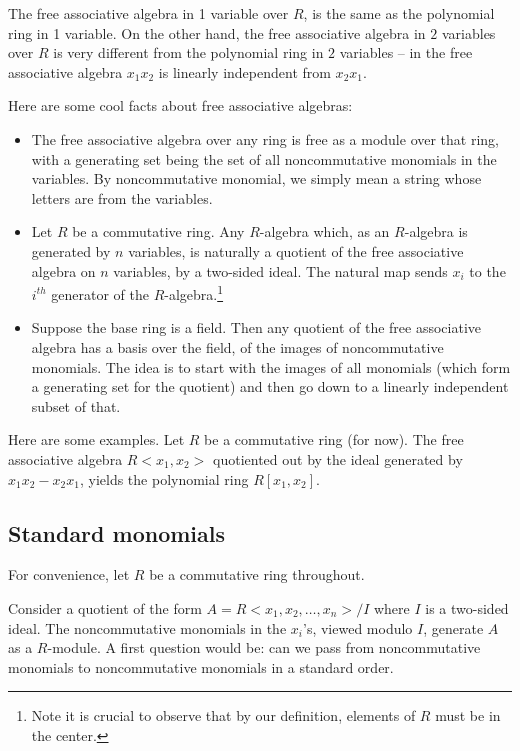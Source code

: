 \documentclass[a4paper]{amsart}
\begin{document}
The free associative algebra in 1 variable over $R$, is the same as
the polynomial ring in 1 variable. On the other hand, the free
associative algebra in $2$ variables over $R$ is very different from
the polynomial ring in $2$ variables -- in the free associative
algebra $x_1x_2$ is linearly independent from $x_2x_1$.

Here are some cool facts about free associative algebras:

\begin{itemize}

\item The free associative algebra over any ring is free as a module
  over that ring, with a generating set being the set of all
  noncommutative monomials in the variables. By noncommutative monomial,
  we simply mean a string whose letters are from the variables.

\item Let $R$ be a commutative ring. Any $R$-algebra which, as an
  $R$-algebra is generated by $n$ variables, is naturally a quotient
  of the free associative algebra on $n$ variables, by a two-sided
  ideal. The natural map sends $x_i$ to the $i^{th}$ generator of the
  $R$-algebra.\footnote{Note it is crucial to observe that by our
    definition, elements of $R$ must be in the center.}
\item Suppose the base ring is a field. Then any quotient of the free
  associative algebra has a basis over the field, of the images of
  noncommutative monomials. The idea is to start with the images of
  all monomials (which form a generating set for the quotient) and
  then go down to a linearly independent subset of that.
\end{itemize}

Here are some examples. Let $R$ be a commutative ring (for now). The
free associative algebra $R<x_1,x_2>$ quotiented out by the ideal
generated by $x_1x_2 - x_2x_1$, yields the polynomial ring $R[x_1,x_2]$.

\subsection{Standard monomials}

For convenience, let $R$ be a commutative ring throughout.

Consider a quotient of the form $A = R<x_1,x_2,\ldots,x_n>/I$ where
$I$ is a two-sided ideal. The noncommutative monomials in the $x_i$'s,
viewed modulo $I$, generate $A$ as a $R$-module. A first question
would be: can we pass from noncommutative monomials to noncommutative
monomials in a standard order.
\end{document}
